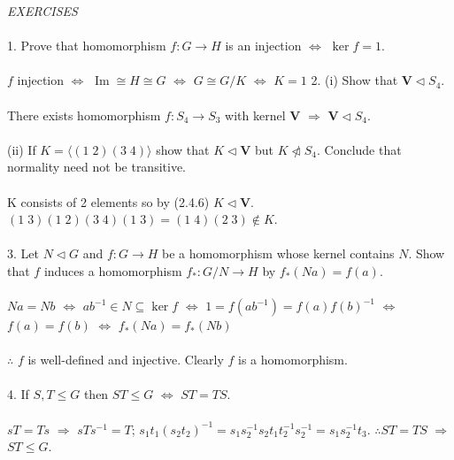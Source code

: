 \documentclass{article}
\DeclareMathOperator{\im}{Im}
\begin{document}
\begin{siderules}\color{blue}\textit{EXERCISES}\color{black}\\\\
\color{blue}1. Prove that homomorphism \(f:G\to H\) is an injection \(\Longleftrightarrow\) \(\ker f=1\).\\\\\color{black}
\(f\) injection \(\Longleftrightarrow\) \(\im\cong H\cong G\) \(\Longleftrightarrow\) \(G\cong G/K\) \(\Longleftrightarrow\) \(K=1\)
\color{blue}2. (i) Show that \(\mathbf{V}\vartriangleleft S_{4}\).\color{black}\\\\
There exists homomorphism \(f:S_{4}\to S_{3}\) with kernel \(\mathbf{V}\) \(\Longrightarrow\) \(\mathbf{V}\vartriangleleft S_{4}\).\\\\
\color{blue}(ii) If \(K=\langle (1\;2)(3\;4)\rangle\) show that \(K\vartriangleleft\mathbf{V}\) but \(K\not\vartriangleleft S_{4}\). Conclude that normality need not be transitive.\\\\\color{black}
K consists of 2 elements so by \color{gray}(2.4.6) \color{black} \(K\vartriangleleft \mathbf{V}\). \((1\;3)(1\;2)(3\;4)(1\;3)=(1\;4)(2\;3)\notin K\).\\\\
\color{blue}3. Let \(N\vartriangleleft G\) and \(f:G\to H\) be a homomorphism whose kernel contains \(N\). 
Show that \(f\) induces a homomorphism \(f_{*}:G/N\to H\) by \(f_{*}(Na)=f(a)\).\\\\\color{black}
\(Na=Nb\) \(\Longleftrightarrow\) \(ab^{-1}\in N\subseteq\ker f\) \(\Longleftrightarrow\) \(1=f(ab^{-1})=f(a)f(b)^{-1}\) \(\Longleftrightarrow\) \(f(a)=f(b)\) \(\Longleftrightarrow\) \(f_{*}(Na)=f_{*}(Nb)\)\\\\
\(\therefore\) \(f\) is well-defined and injective. Clearly \(f\) is a homomorphism.\\\\
\color{blue}4. If \(S,T\le G\) then \(ST\le G\) \(\Longleftrightarrow\) \(ST=TS\).\\\\\color{black}
\(sT=Ts\) \(\Longrightarrow\) \(sTs^{-1}=T\); \(s_{1}t_{1}(s_{2}t_{2})^{-1}=s_{1}s_{2}^{-1}s_{2}t_{1}t_{2}^{-1}s_{2}^{-1}=s_{1}s_{2}^{-1}t_{3}\). \(\therefore ST=TS\) \(\Longrightarrow\) \(ST\le G\).\\\\

\end{siderules}
\end{document}
